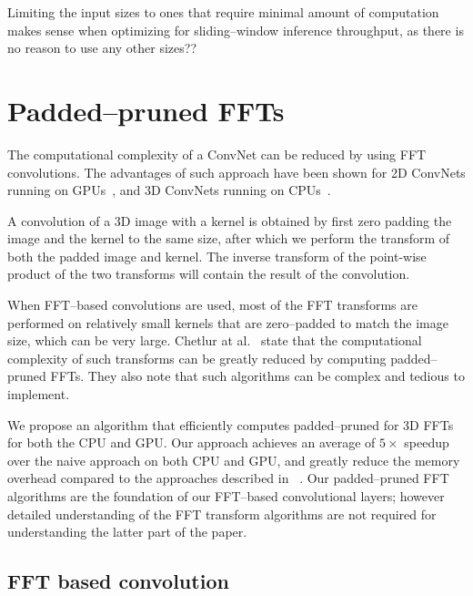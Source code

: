 \documentclass[conference]{IEEEtran}
\begin{document}
  Limiting the input sizes to ones that require minimal amount of
  computation makes sense when optimizing for sliding--window
  inference throughput, as there is no reason to use any other sizes??




\section{Padded--pruned FFTs}

  The computational complexity of a ConvNet can be reduced by using
  FFT convolutions.  The advantages of such approach have been shown
  for 2D ConvNets running on
  GPUs~\cite{mathieu-iclr-14,vasilache2014fast}, and 3D ConvNets
  running on CPUs~\cite{zlateski2015znn}.

  A convolution of a 3D image with a kernel is obtained by first zero
  padding the image and the kernel to the same size, after which we
  perform the transform of both the padded image and kernel.  The
  inverse transform of the point-wise product of the two transforms
  will contain the result of the convolution.

  When FFT--based convolutions are used, most of the FFT transforms
  are performed on relatively small kernels that are zero--padded to
  match the image size, which can be very large.  Chetlur at
  al.~\cite{chetlur2014cudnn} state that the computational complexity
  of such transforms can be greatly reduced by computing
  padded--pruned FFTs.  They also note that such algorithms can be
  complex and tedious to implement.

  We propose an algorithm that efficiently computes padded--pruned for
  3D FFTs for both the CPU and GPU. Our approach achieves an average
  of $5 \times$ speedup over the naive approach on both CPU and GPU,
  and greatly reduce the memory overhead compared to the approaches
  described in ~\cite{mathieu-iclr-14,vasilache2014fast}.  Our
  padded--pruned FFT algorithms are the foundation of our FFT--based
  convolutional layers; however detailed understanding of the FFT
  transform algorithms are not required for understanding the latter
  part of the paper.

\subsection{FFT based convolution}
\end{document}

